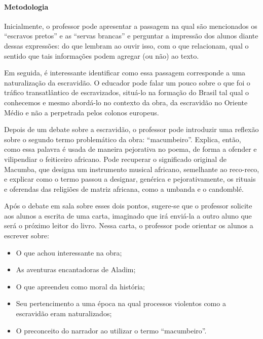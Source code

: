 \documentclass[11pt]{extarticle}
\begin{document}
\paragraph{Metodologia} Inicialmente, o professor pode apresentar a passagem na qual são mencionados os ``escravos pretos'' e as ``servas brancas'' e perguntar a impressão dos alunos diante dessas expressões: do que lembram ao ouvir isso, com o que relacionam, qual o sentido que tais informações podem agregar (ou não) ao texto.

Em seguida, é interessante identificar como essa passagem corresponde a uma naturalização da escravidão. O educador pode falar um pouco sobre o que foi o tráfico transatlântico de escravizados, situá-lo na formação do Brasil tal qual o conhecemos e mesmo abordá-lo no contexto da obra, da escravidão no Oriente Médio e não a perpetrada pelos colonos europeus.

Depois de um debate sobre a escravidão, o professor pode introduzir uma reflexão sobre o segundo termo problemático da obra: ``macumbeiro''. Explica, então, como essa palavra é usada de maneira pejorativa no poema, de forma a ofender e vilipendiar o feiticeiro africano. Pode recuperar o significado original de Macumba, que designa um instrumento musical africano, semelhante ao reco-reco, e explicar como o termo passou a designar, genérica e pejorativamente, os rituais e oferendas das religiões de matriz africana, como a umbanda e o candomblé.

Após o debate em sala sobre esses dois pontos, sugere-se que o professor solicite aos alunos a escrita de uma carta, imaginado que irá enviá-la a outro aluno que será o próximo leitor do livro.
Nessa carta, o professor pode orientar os alunos a escrever sobre:

\begin{itemize}
\item O que achou interessante na obra;

\item As aventuras encantadoras de Aladim;

\item O que apreendeu como moral da história;

\item Seu pertencimento a uma época na qual processos violentos como a escravidão eram naturalizados;

\item O preconceito do narrador ao utilizar o termo ``macumbeiro''.
\end{itemize}
\end{document}
